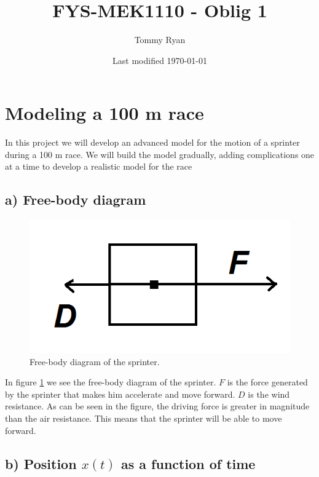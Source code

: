 \documentclass[a4paper,10pt,english]{article}
\title{FYS-MEK1110 - Oblig 1}
\author{Tommy Ryan}
\date{Last modified \today}
\begin{document}
\maketitle

\section{Modeling a 100 m race}

In this project we will develop an advanced model for the motion of a sprinter during a 100 m race. We will build the model gradually, adding complications one at a time to develop a realistic model for the race

\subsection*{a) Free-body diagram}

\begin{figure}[h!]
        \centering 
        \includegraphics[scale=0.8]{a.png} 
        \caption{Free-body diagram of the sprinter.}
        \label{fig:a}
\end{figure}

In figure \ref{fig:a} we see the free-body diagram of the sprinter. $F$ is the force generated by the sprinter that makes him accelerate and move forward. $D$ is the wind resistance. As can be seen in the figure, the driving force is greater in magnitude than the air resistance. This means that the sprinter will be able to move forward. 


\subsection*{b) Position $x(t)$ as a function of time}
\end{document}

